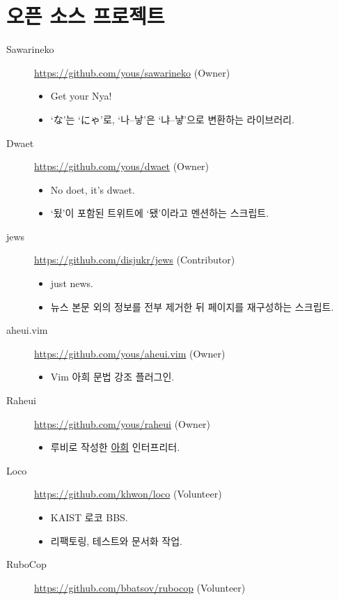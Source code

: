 \documentclass[a4paper,10pt]{article}
\begin{document}
\section{오픈 소스 프로젝트}
\begin{description}
  \item[Sawarineko] \url{https://github.com/yous/sawarineko} (Owner)
    \begin{itemize}
      \item Get your Nya!
      \item `な'는 `にゃ'로, `나--낳'은 `냐--냫'으로 변환하는 라이브러리.
    \end{itemize}
  \item[Dwaet] \url{https://github.com/yous/dwaet} (Owner)
    \begin{itemize}
      \item No doet, it's dwaet.
      \item `됬'이 포함된 트위트에 `됐'이라고 멘션하는 스크립트.
    \end{itemize}
  \item[jews] \url{https://github.com/disjukr/jews} (Contributor)
    \begin{itemize}
      \item just news.
      \item 뉴스 본문 외의 정보를 전부 제거한 뒤 페이지를 재구성하는 스크립트.
    \end{itemize}
  \item[aheui.vim] \url{https://github.com/yous/aheui.vim} (Owner)
    \begin{itemize}
      \item Vim 아희 문법 강조 플러그인.
    \end{itemize}
  \item[Raheui] \url{https://github.com/yous/raheui} (Owner)
    \begin{itemize}
      \item 루비로 작성한 \href{http://aheui.github.io}{아희} 인터프리터.
    \end{itemize}
  \item[Loco] \url{https://github.com/khwon/loco} (Volunteer)
    \begin{itemize}
      \item KAIST 로코 BBS.
      \item 리팩토링, 테스트와 문서화 작업.
    \end{itemize}
  \item[RuboCop] \url{https://github.com/bbatsov/rubocop} (Volunteer)
    \begin{itemize}

\end{itemize}
\end{description}
\end{document}
